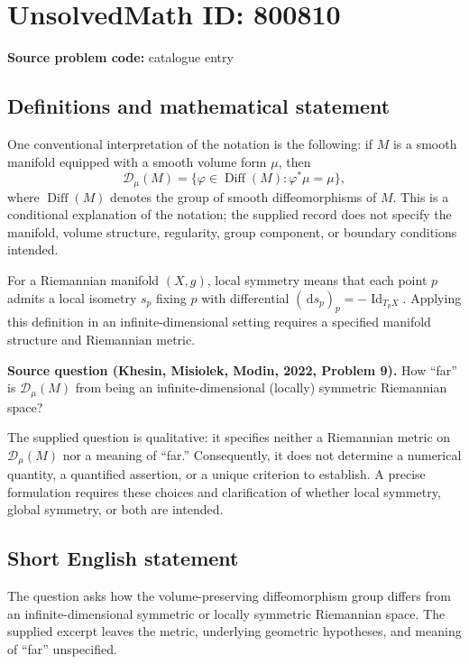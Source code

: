 \documentclass[11pt]{article}
\newcommand{\dd}{\,\mathrm{d}}
\begin{document}
\section*{UnsolvedMath ID: 800810}
\textbf{Source problem code:} catalogue entry
\subsection{Definitions and mathematical statement}
One conventional interpretation of the notation is the following: if \(M\) is a smooth manifold equipped with a smooth volume form \(\mu\), then
\[
\mathscr{D}_{\mu}(M)=\{\varphi\in\operatorname{Diff}(M):\varphi^{*}\mu=\mu\},
\]
where \(\operatorname{Diff}(M)\) denotes the group of smooth diffeomorphisms of \(M\). This is a conditional explanation of the notation; the supplied record does not specify the manifold, volume structure, regularity, group component, or boundary conditions intended.

For a Riemannian manifold \((X,g)\), local symmetry means that each point \(p\) admits a local isometry \(s_p\) fixing \(p\) with differential \((\dd s_p)_p=-\operatorname{Id}_{T_pX}\). Applying this definition in an infinite-dimensional setting requires a specified manifold structure and Riemannian metric.

\textbf{Source question (Khesin, Misiolek, Modin, 2022, Problem 9).} How ``far'' is \(\mathscr{D}_{\mu}(M)\) from being an infinite-dimensional (locally) symmetric Riemannian space?

The supplied question is qualitative: it specifies neither a Riemannian metric on \(\mathscr{D}_{\mu}(M)\) nor a meaning of ``far.'' Consequently, it does not determine a numerical quantity, a quantified assertion, or a unique criterion to establish. A precise formulation requires these choices and clarification of whether local symmetry, global symmetry, or both are intended.
\subsection{Short English statement}
The question asks how the volume-preserving diffeomorphism group differs from an infinite-dimensional symmetric or locally symmetric Riemannian space. The supplied excerpt leaves the metric, underlying geometric hypotheses, and meaning of ``far'' unspecified.
\end{document}
